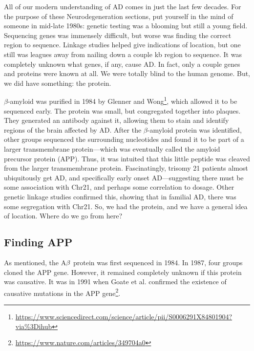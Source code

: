 All of our modern understanding of AD comes in just the last few decades. For the purpose of these Neurodegeneration sections, put yourself in the mind of someone in mid-late 1980s: genetic testing was a blooming but still a young field. Sequencing genes was immensely difficult, but worse was finding the correct region to sequence. Linkage studies helped give indications of location, but one still was leagues away from nailing down a couple kb region to sequence. It was completely unknown what genes, if any, cause AD. In fact, only a couple genes and proteins were known at all. We were totally blind to the human genome. But, we did have something: the protein.\newline

$\beta$-amyloid was purified in 1984 by Glenner and Wong\footnote{\url{https://www.sciencedirect.com/science/article/pii/S0006291X84801904?via\%3Dihub}}, which allowed it to be sequenced early. The protein was small, but congregated together into plaques. They generated an antibody against it, allowing them to stain and identify regions of the brain affected by AD. After the $\beta$-amyloid protein was identified, other groups sequenced the surrounding nucleotides and found it to be part of a larger transmembrane protein---which was eventually called the amyloid precursor protein (APP). Thus, it was intuited that this little peptide was cleaved from the larger transmembrane protein. Fascinatingly, trisomy 21 patients almost ubiquitously get AD, and specifically early onset AD---suggesting there must be some association with Chr21, and perhaps some correlation to dosage. Other genetic linkage studies confirmed this, showing that in familial AD, there was some segregation with Chr21. So, we had the protein, and we have a general idea of location. Where do we go from here?

\subsection*{Finding APP}


As mentioned, the A$\beta$ protein was first sequenced in 1984. In 1987, four groups cloned the APP gene. However, it remained completely unknown if this protein was causative. It was in 1991 when Goate et al. confirmed the existence of causative mutations in the APP gene\footnote{\url{https://www.nature.com/articles/349704a0}}.\newline

